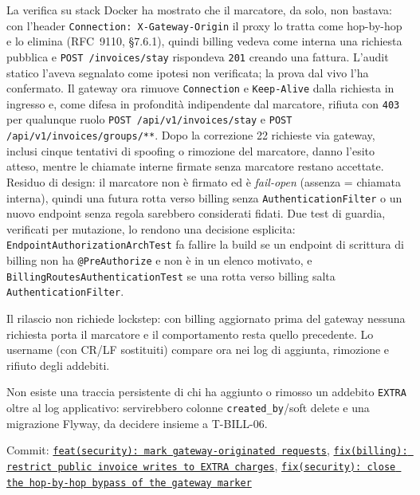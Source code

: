 ﻿\documentclass[a4paper,12pt]{report}
\newcommand{\commitref}[2]{\texttt{\small \href{https://github.com/diegoandruccioli/hotel-pms/commit/#1}{#2}}}
\begin{document}
\begin{notebox}[title={Bypass trovato dalla verifica live}]
La verifica su stack Docker ha mostrato che il marcatore, da solo, non
bastava: con l'header \texttt{Connection: X-Gateway-Origin} il proxy lo
tratta come hop-by-hop e lo elimina (RFC~9110, \S7.6.1), quindi billing
vedeva come interna una richiesta pubblica e \texttt{POST /invoices/stay}
rispondeva \texttt{201} creando una fattura. L'audit statico l'aveva
segnalato come ipotesi non verificata; la prova dal vivo l'ha confermato.
Il gateway ora rimuove \texttt{Connection} e \texttt{Keep-Alive} dalla
richiesta in ingresso e, come difesa in profondità indipendente dal
marcatore, rifiuta con \texttt{403} per qualunque ruolo
\texttt{POST /api/v1/invoices/stay} e \texttt{POST /api/v1/invoices/groups/**}.
Dopo la correzione 22 richieste via gateway, inclusi cinque tentativi di
spoofing o rimozione del marcatore, danno l'esito atteso, mentre le
chiamate interne firmate senza marcatore restano accettate.
Residuo di design: il marcatore non è firmato ed è \emph{fail-open}
(assenza = chiamata interna), quindi una futura rotta verso billing senza
\texttt{AuthenticationFilter} o un nuovo endpoint senza regola sarebbero
considerati fidati. Due test di guardia, verificati per mutazione, lo
rendono una decisione esplicita: \texttt{EndpointAuthorizationArchTest}
fa fallire la build se un endpoint di scrittura di billing non ha
\texttt{@PreAuthorize} e non è in un elenco motivato, e
\texttt{BillingRoutesAuthenticationTest} se una rotta verso billing
salta \texttt{AuthenticationFilter}.
\end{notebox}

Il rilascio non richiede lockstep: con billing aggiornato prima del
gateway nessuna richiesta porta il marcatore e il comportamento resta
quello precedente. Lo username (con CR/LF sostituiti) compare ora nei log
di aggiunta, rimozione e rifiuto degli addebiti.
\begin{notebox}[title={Residuo dichiarato}]
Non esiste una traccia persistente di chi ha aggiunto o rimosso un
addebito \texttt{EXTRA} oltre al log applicativo: servirebbero colonne
\texttt{created\_by}/soft delete e una migrazione Flyway, da decidere
insieme a T-BILL-06.
\end{notebox}
Commit: \commitref{6d62971}{feat(security): mark gateway-originated requests},
\commitref{1d9e7a0}{fix(billing): restrict public invoice writes to EXTRA charges},
\commitref{ad3a732}{fix(security): close the hop-by-hop bypass of the gateway marker}
\end{document}
